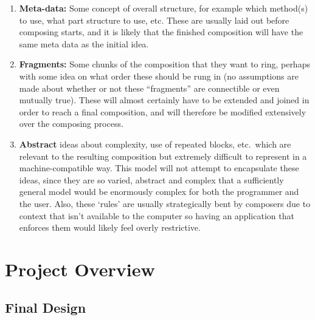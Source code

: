 \documentclass[12pt]{article}
\begin{document}
\begin{enumerate}
    \item \textbf{Meta-data:} Some concept of overall structure, for example which method(s) to use,
        what part structure to use, etc.  These are usually laid out before composing starts, and
        it is likely that the finished composition will have the same meta data as the initial idea.
    \item \textbf{Fragments:} Some chunks of the composition that they want to ring, perhaps with
        some idea on what order these should be rung in (no assumptions are made about whether or
        not these ``fragments'' are connectible or even mutually true).  These will almost certainly
        have to be extended and joined in order to reach a final composition, and will therefore be
        modified extensively over the composing process.
    \item \textbf{Abstract} ideas about complexity, use of repeated blocks, etc.\ which are
        relevant to the resulting composition but extremely difficult to represent in a
        machine-compatible way.  This model will not attempt to encapsulate these ideas, since they
        are so varied, abstract and complex that a sufficiently general model would be enormously
        complex for both the programmer and the user.  Also, these `rules' are usually strategically
        bent by composers due to context that isn't available to the computer so having an
        application that enforces them would likely feel overly restrictive.
\end{enumerate}



\pagebreak

\section{Project Overview}\label{sec:proj_arch}

\subsection{Final Design}
\end{document}
